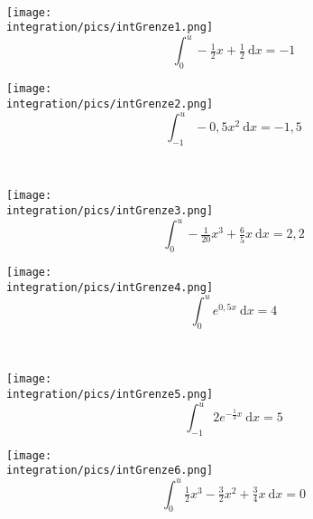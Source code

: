 \documentclass[a4paper,12pt, headsepline, ngerman]{scrartcl}
\theoremstyle{definition}
\newcommand{\td}{\ \text{d}}
\begin{document}
\begin{Exercise}[title={\raggedright\normalfont Schätze jeweils ein \(u\) graphisch ab und berechne dann die Lösung. Das gesuchte \(u\) soll immer größer als die untere Grenze sein:}, label=intGrenzeA1]\\
	\begin{minipage}{\textwidth}
		\begin{minipage}{.5\textwidth}
			\texttt{[image: \\integration/pics/intGrenze1.png]}
			\[\int_0^u-\tfrac{1}{2}x+\tfrac{1}{2} \td x=-1\]
		\end{minipage}
		\begin{minipage}{.5\textwidth}
			\texttt{[image: \\integration/pics/intGrenze2.png]}
			\[\int_{-1}^u-0,5x^2 \td x=-1,5\]
		\end{minipage}\vspace{\baselineskip}\\
		\begin{minipage}{.5\textwidth}
			\texttt{[image: \\integration/pics/intGrenze3.png]}
			\[\int_0^u-\tfrac{1}{20}x^3+\tfrac{6}{5}x \td x=2,2\]
		\end{minipage}
		\begin{minipage}{.5\textwidth}
			\texttt{[image: \\integration/pics/intGrenze4.png]}
			\[\int_0^u e^{0,5x} \td x=4\]
		\end{minipage}\vspace{\baselineskip}\\
		\begin{minipage}{.5\textwidth}
			\texttt{[image: \\integration/pics/intGrenze5.png]}
			\[\int_{-1}^u 2e^{-\tfrac{1}{3}x} \td x=5\]
			\phantom{Finde 2 verschiedene \(u>0\).}
		\end{minipage}
		\begin{minipage}{.5\textwidth}
			\texttt{[image: \\integration/pics/intGrenze6.png]}
			\[\int_0^u \tfrac{1}{2}x^3-\tfrac{3}{2}x^2+\tfrac{3}{4}x \td x=0\]
		\end{minipage}
	\end{minipage}
\end{Exercise}
\end{document}
